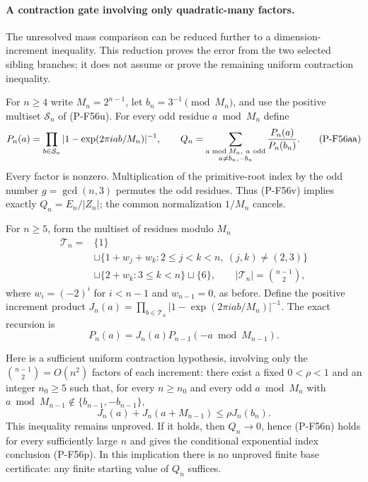 \paragraph{A contraction gate involving only quadratic-many factors.}
The unresolved mass comparison can be reduced further to a
dimension-increment inequality. This reduction proves the error
from the two selected sibling branches; it does not assume or
prove the remaining uniform contraction inequality.

For $n\ge4$ write $M_n=2^{n-1}$, let
$b_n=3^{-1}\pmod {M_n}$, and use the positive multiset
$\mathcal S_n$ of (P-F56u). For every odd residue $a\bmod M_n$
define
\[
 P_n(a)=
 \prod_{b\in\mathcal S_n}
       |1-\exp(2\pi iab/M_n)|^{-1},\qquad
 Q_n=\sum_{\substack{a\bmod M_n,\ a\ {\rm odd}\\
                               a\ne b_n,-b_n}}
                              \frac{P_n(a)}{P_n(b_n)}.
 \tag{P-F56aa}
\]
Every factor is nonzero. Multiplication of the primitive-root
index by the odd number $g=\gcd(n,3)$ permutes the odd residues.
Thus (P-F56v) implies exactly $Q_n=E_n/|Z_n|$; the common
normalization $1/M_n$ cancels.

For $n\ge5$, form the multiset of residues modulo $M_n$
\[
 \begin{split}
 \mathcal T_n={}&\{1\}\\
 &\sqcup\{1+w_j+w_k:2\le j<k<n,\ (j,k)\ne(2,3)\}\\
 &\sqcup\{2+w_k:3\le k<n\}\sqcup\{6\},
 \qquad |\mathcal T_n|=\binom{n-1}2,
 \end{split}
 \tag{P-F56ab}
\]
where $w_i=(-2)^i$ for $i<n-1$ and $w_{n-1}=0$,
as before. Define the positive increment product
$J_n(a)=\prod_{b\in\mathcal T_n}
 |1-\exp(2\pi iab/M_n)|^{-1}$.
The exact recursion is
\[
             P_n(a)=J_n(a)P_{n-1}(-a\bmod M_{n-1}).
 \tag{P-F56ac}
\]

Here is a sufficient uniform contraction hypothesis, involving
only the $\binom{n-1}2=O(n^2)$ factors of each increment:
there exist a fixed $0<\rho<1$ and an integer $n_0\ge5$ such that,
for every $n\ge n_0$ and every odd $a\bmod M_n$ with
$a\bmod M_{n-1}\notin\{b_{n-1},-b_{n-1}\}$,
\[
 J_n(a)+J_n(a+M_{n-1})\le \rho J_n(b_n).
 \tag{P-F56ad}
\]
This inequality remains unproved. If it holds, then
$Q_n\longrightarrow0$, hence (P-F56n) holds for every
sufficiently large $n$ and gives the conditional exponential
index conclusion (P-F56p).
In this implication there is no unproved finite base
certificate: any finite starting value of $Q_n$ suffices.

